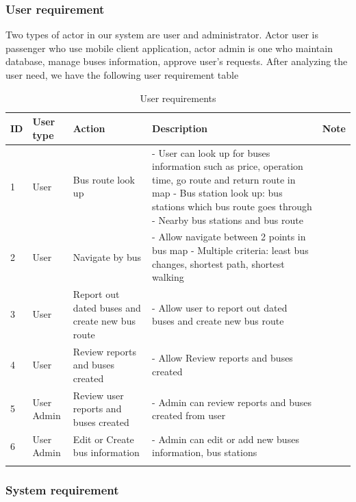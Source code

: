 	\subsubsection{User requirement}
	Two types of actor in our system are user and administrator. Actor user is passenger who use mobile client application, actor admin is one who maintain database, manage buses information, approve user's requests. After analyzing the user need, we have the following user requirement table
	\begin{center}
		\begin{longtable}{|p{1cm}|p{1.5cm}|p{2.5cm}|>{\raggedright\arraybackslash}p{5cm}|p{2cm}|} 
			\hline
			\bfseries ID & \bfseries User type & \bfseries Action & \bfseries Description & \bfseries Note \\ 
			\hline\hline
			1 & User & Bus route look up & - User can look up for buses information such as price, operation time, go route and return route in map \newline
			- Bus station look up: bus stations which bus route goes through \newline
			- Nearby bus stations and bus route & \\ 
			\hline
			2 & User & Navigate by bus & - Allow navigate between 2 points in bus map \newline
			- Multiple criteria: least bus changes, shortest path, shortest walking  & \\ 
			\hline
			3 & User & Report out dated buses and create new bus route & - Allow user to report out dated buses and create new bus route  & \\ 
			\hline
			4 & User & Review reports and buses created & - Allow Review reports and buses created  & \\ 
			\hline
			5 & User Admin & Review user reports and buses created & - Admin can review reports and buses created from user & \\ 
			\hline
			6 & User Admin & Edit or Create bus information & - Admin can edit or add new buses information, bus stations & \\ 
			\hline
			\caption{User requirements}	
			\label{table:user_requirements} 
		\end{longtable}
	\end{center}

	\subsubsection{System requirement}

